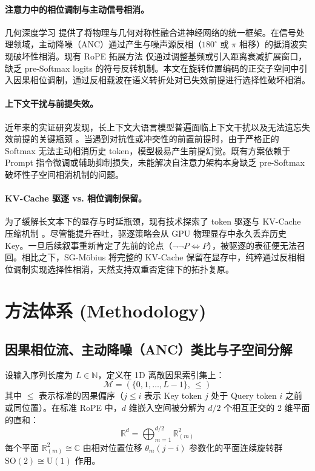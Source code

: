 \documentclass[11pt,a4paper]{article}
\theoremstyle{definition}
\begin{document}
\paragraph{注意力中的相位调制与主动信号相消。}
几何深度学习 \cite{bronstein2021geometric} 提供了将物理与几何对称性融合进神经网络的统一框架。在信号处理领域，主动降噪（ANC）通过产生与噪声源反相（$180^\circ$ 或 $\pi$ 相移）的抵消波实现破坏性相消。现有 RoPE 拓展方法 \cite{press2021train, chen2023extending, peng2023yarn} 仅通过调整基频或引入距离衰减扩展窗口，缺乏 pre-Softmax logits 的符号反转机制。本文在旋转位置编码的正交子空间中引入因果相位调制，通过反相载波在语义转折处对已失效前提进行选择性破坏相消。

\paragraph{上下文干扰与前提失效。}
近年来的实证研究发现，长上下文大语言模型普遍面临上下文干扰以及无法遗忘失效前提的关键瓶颈 \cite{liu2024lost, hsieh2024ruler, kamradt2023needle}。当遇到对抗性或冲突性的前置前提时，由于严格正的 Softmax 无法主动相消历史 token，模型极易产生前提幻觉。既有方案依赖于 Prompt 指令微调或辅助抑制损失，未能解决自注意力架构本身缺乏 pre-Softmax 破坏性子空间相消机制的问题。

\paragraph{KV-Cache 驱逐 vs. 相位调制保留。}
为了缓解长文本下的显存与时延瓶颈，现有技术探索了 token 驱逐与 KV-Cache 压缩机制 \cite{dao2022flashattention, xiao2023streamingllm, zhang2023h2o}。尽管能提升吞吐，驱逐策略会从 GPU 物理显存中永久丢弃历史 Key。一旦后续叙事重新肯定了先前的论点（$\neg\neg P \iff P$），被驱逐的表征便无法召回。相比之下，SG-M\"obius 将完整的 KV-Cache 保留在显存中，纯粹通过反相相位调制实现选择性相消，天然支持双重否定律下的拓扑复原。

\section{方法体系 (Methodology)}
\subsection{因果相位流、主动降噪（ANC）类比与子空间分解}
设输入序列长度为 $L \in \mathbb{N}$，定义在 1D 离散因果索引集上：
\begin{equation}
\mathcal{M} = \left( \{0, 1, \dots, L-1\}, \, \le \right)
\end{equation}
其中 $\le$ 表示标准的因果偏序（$j \le i$ 表示 Key token $j$ 处于 Query token $i$ 之前或同位置）。在标准 RoPE 中，$d$ 维嵌入空间被分解为 $d/2$ 个相互正交的 2 维平面的直和：
\begin{equation}
\mathbb{R}^d = \bigoplus_{m=1}^{d/2} \mathbb{R}^2_{(m)}
\end{equation}
每个平面 $\mathbb{R}^2_{(m)} \cong \mathbb{C}$ 由相对位置位移 $\theta_m (j - i)$ 参数化的平面连续旋转群 $\mathrm{SO}(2) \cong \mathrm{U}(1)$ 作用。
\end{document}
